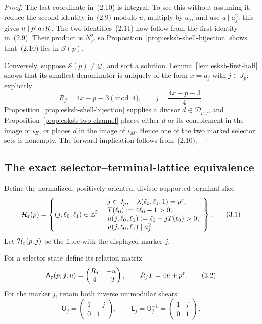\begin{proof}
The last coordinate in~(2.10) is integral.  To see this without assuming it,
reduce the second identity in~(2.9) modulo \(u\), multiply by \(a_j\), and
use \(u\mid a_j^2\): this gives \(u\mid p^\varepsilon a_jK\).
The two identities~(2.11) now follow from the first identity in~(2.9).
Their product is \(N_j^2\), so Proposition~\ref{prop:esksb-shell-bijection}
shows that~(2.10) lies in \(\mathscr S(p)\).

Conversely, suppose \(\mathscr S(p)\neq\varnothing\), and sort a solution.
Lemma~\ref{lem:esksb-first-half} shows that its smallest denominator is uniquely
of the form \(x=a_j\) with \(j\in J_p\): explicitly
\[
 R_j=4x-p\equiv3\pmod4,
 \qquad j=\frac{4x-p-3}{4}.
\]
Proposition~\ref{prop:esksb-shell-bijection} supplies a divisor
\(d\in\mathscr D_{p,j}\), and Proposition~\ref{prop:esksb-two-channel} places
either \(d\) or its complement in the image of \(\iota_E\), or places \(d\)
in the image of \(\iota_M\).  Hence one of the two marked selector sets is
nonempty.  The forward implication follows from~(2.10).
\end{proof}

\subsection{The exact selector--terminal-lattice equivalence}

Define the normalized, positively oriented, divisor-supported terminal slice
\begin{equation}
 \mathcal H_\varepsilon(p)=
 \left\{(j,\ell_0,\ell_1)\in\mathbb Z^3:
 \begin{array}{l}
 j\in J_p,\quad \lambda(\ell_0,\ell_1,1)=p^\varepsilon,\\
 T(\ell_0):=4\ell_0-1>0,\\
 u(j,\ell_0,\ell_1):=\ell_1+jT(\ell_0)>0,\\
 u(j,\ell_0,\ell_1)\mid a_j^2
 \end{array}
 \right\}.                                                   \tag{3.1}
\end{equation}
Let \(\mathcal H_\varepsilon(p,j)\) be the fibre with the displayed marker \(j\).

For a selector state define its relation matrix
\begin{equation}
 \mathsf A_\varepsilon(p;j,u)=
 \begin{pmatrix}
 R_j&-u\\
 4&-T
 \end{pmatrix},
 \qquad R_jT=4u+p^\varepsilon.                                     \tag{3.2}
\end{equation}
For the marker \(j\), retain both inverse unimodular shears
\begin{equation}
 \mathsf U_j=
 \begin{pmatrix}1&-j\\0&1\end{pmatrix},
 \qquad
 \mathsf L_j=\mathsf U_j^{-1}=
 \begin{pmatrix}1&j\\0&1\end{pmatrix}.                    \tag{3.3}
\end{equation}

